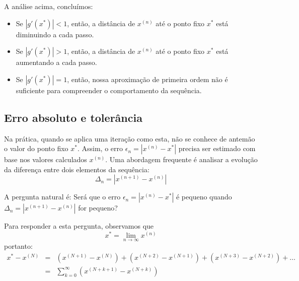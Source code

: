 \begin{obs} A análise acima, concluímos:
\begin{itemize}
\item Se $|g'(x^*)|<1$, então, a distância de $x^{(n)}$ até o ponto fixo $x^*$ está diminuindo a cada passo.
\item Se $|g'(x^*)|>1$, então, a distância de $x^{(n)}$ até o ponto fixo $x^*$ está aumentando a cada passo.
\item Se $|g'(x^*)|=1$, então, nossa aproximação de primeira ordem não é suficiente para compreender o comportamento da sequência.
\end{itemize}
\end{obs}

\subsection{Erro absoluto e tolerância}

Na prática, quando se aplica uma iteração como esta, não se conhece de antemão o valor do ponto fixo $x^*$. Assim, o erro $\epsilon_n=\left|x^{(n)}-x^*\right|$ precisa ser estimado com base nos valores calculados $x^{(n)}$. Uma abordagem frequente é analisar a evolução da diferença entre dois elementos da sequência:
$$\Delta_n=\left|x^{(n+1)}-x^{(n)}\right|$$

A pergunta natural é: Será que o erro $\epsilon_n=\left|x^{(n)}-x^*\right|$ é pequeno quando  $\Delta_n=\left|x^{(n+1)}-x^{(n)}\right|$ for pequeno?

Para responder a esta pergunta, observamos que
$$x^*=\lim_{n\to \infty }x^{(n)}$$
portanto:
\begin{eqnarray*}
x^*-x^{(N)}&=&  \left(x^{(N+1)}-x^{(N)}\right)+\left(x^{(N+2)}-x^{(N+1)}\right)+\left(x^{(N+3)}-x^{(N+2)}\right)+\ldots\\
&=&\sum_{k=0}^\infty \left(x^{(N+k+1)}-x^{(N+k)}\right)
\end{eqnarray*}

